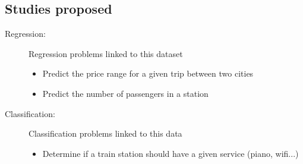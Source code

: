 \documentclass[10pt,a4paper,hidelinks]{article}
\begin{document}
\subsection{Studies proposed}
\begin{description}
    \item[Regression:] Regression problems linked to this dataset
        \begin{itemize}
            \item Predict the price range for a given trip between two cities
            \item Predict the number of passengers in a station
        \end{itemize}
    \item[Classification:] Classification problems linked to this data
        \begin{itemize}
            \item Determine if a train station should have a given service (piano, wifi...)
        \end{itemize}
\end{description}
\end{document}
